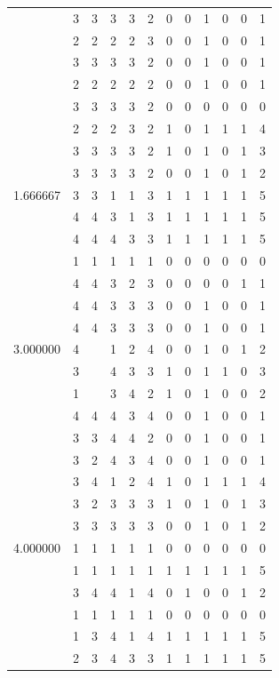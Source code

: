 \documentclass[]{book}
\theoremstyle{definition}
\theoremstyle{definition}
\theoremstyle{definition}
\theoremstyle{remark}
\begin{document}
\begin{table}
{\begin{tabular}[t]{rrrrrrrrrrrr}
 & 3 & 3 & 3 & 3 & 2 & 0 & 0 & 1 & 0 & 0 & 1\\
 & 2 & 2 & 2 & 2 & 3 & 0 & 0 & 1 & 0 & 0 & 1\\
 & 3 & 3 & 3 & 3 & 2 & 0 & 0 & 1 & 0 & 0 & 1\\
 & 2 & 2 & 2 & 2 & 2 & 0 & 0 & 1 & 0 & 0 & 1\\
 & 3 & 3 & 3 & 3 & 2 & 0 & 0 & 0 & 0 & 0 & 0\\
 & 2 & 2 & 2 & 3 & 2 & 1 & 0 & 1 & 1 & 1 & 4\\
 & 3 & 3 & 3 & 3 & 2 & 1 & 0 & 1 & 0 & 1 & 3\\
 & 3 & 3 & 3 & 3 & 2 & 0 & 0 & 1 & 0 & 1 & 2\\
1.666667 & 3 & 3 & 1 & 1 & 3 & 1 & 1 & 1 & 1 & 1 & 5\\
 & 4 & 4 & 3 & 1 & 3 & 1 & 1 & 1 & 1 & 1 & 5\\
 & 4 & 4 & 4 & 3 & 3 & 1 & 1 & 1 & 1 & 1 & 5\\
 & 1 & 1 & 1 & 1 & 1 & 0 & 0 & 0 & 0 & 0 & 0\\
 & 4 & 4 & 3 & 2 & 3 & 0 & 0 & 0 & 0 & 1 & 1\\
 & 4 & 4 & 3 & 3 & 3 & 0 & 0 & 1 & 0 & 0 & 1\\
 & 4 & 4 & 3 & 3 & 3 & 0 & 0 & 1 & 0 & 0 & 1\\
3.000000 & 4 &  & 1 & 2 & 4 & 0 & 0 & 1 & 0 & 1 & 2\\
 & 3 &  & 4 & 3 & 3 & 1 & 0 & 1 & 1 & 0 & 3\\
 & 1 &  & 3 & 4 & 2 & 1 & 0 & 1 & 0 & 0 & 2\\
 & 4 & 4 & 4 & 3 & 4 & 0 & 0 & 1 & 0 & 0 & 1\\
 & 3 & 3 & 4 & 4 & 2 & 0 & 0 & 1 & 0 & 0 & 1\\
 & 3 & 2 & 4 & 3 & 4 & 0 & 0 & 1 & 0 & 0 & 1\\
 & 3 & 4 & 1 & 2 & 4 & 1 & 0 & 1 & 1 & 1 & 4\\
 & 3 & 2 & 3 & 3 & 3 & 1 & 0 & 1 & 0 & 1 & 3\\
 & 3 & 3 & 3 & 3 & 3 & 0 & 0 & 1 & 0 & 1 & 2\\
4.000000 & 1 & 1 & 1 & 1 & 1 & 0 & 0 & 0 & 0 & 0 & 0\\
 & 1 & 1 & 1 & 1 & 1 & 1 & 1 & 1 & 1 & 1 & 5\\
 & 3 & 4 & 4 & 1 & 4 & 0 & 1 & 0 & 0 & 1 & 2\\
 & 1 & 1 & 1 & 1 & 1 & 0 & 0 & 0 & 0 & 0 & 0\\
 & 1 & 3 & 4 & 1 & 4 & 1 & 1 & 1 & 1 & 1 & 5\\
 & 2 & 3 & 4 & 3 & 3 & 1 & 1 & 1 & 1 & 1 & 5\\

\end{tabular}}
\end{table}
\end{document}
